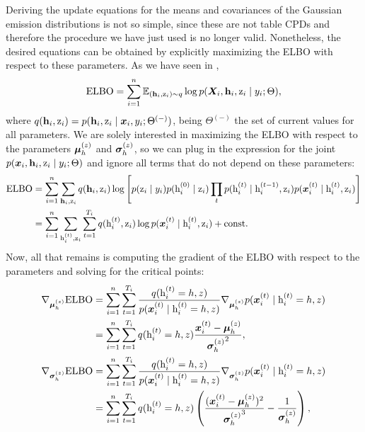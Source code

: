 Deriving the update equations for the means and covariances of the Gaussian emission distributions is not so simple, since these are not table CPDs and therefore the procedure we have just used is no longer valid. Nonetheless, the desired equations can be obtained by explicitly maximizing the ELBO with respect to these parameters. As we have seen in ,
\begin{equation}
	\label{eq:mhmm_elbo}
	\mathrm{ELBO} = \sum_{i=1}^{n} \mathbb{E}_{({\mathbf{h}}_i,{\textnormal{z}}_i) \sim q} \log p({\bm{X}}_i, {\mathbf{h}}_i, {\textnormal{z}}_i \mid y_i; \Theta),
\end{equation}
where $q({\mathbf{h}}_i,{\textnormal{z}}_i) = p({\mathbf{h}}_i, {\textnormal{z}}_i \mid {\bm{x}}_i, y_i; \Theta^{(-)})$, being $\Theta^{(-)}$ the set of current values for all parameters. We are solely interested in maximizing the ELBO with respect to the parameters ${\bm{\mu}}^{(z)}_h$ and ${\bm{\sigma}}^{(z)}_h$, so we can plug in the expression for the joint $p({\bm{x}}_i, {\mathbf{h}}_i, {\textnormal{z}}_i \mid y_i; \Theta)$ and ignore all terms that do not depend on these parameters:
\begin{align}
	\label{eq:mhmm_elbo_gaussian_params}
	\mathrm{ELBO} &= \sum_{i=1}^n \sum_{{\mathbf{h}}_i, {\textnormal{z}}_i} q({\mathbf{h}}_i,{\textnormal{z}}_i) \log \left[p({\textnormal{z}}_i \mid y_i) p({\textnormal{h}}^{(0)}_i \mid {\textnormal{z}}_i) \prod_t p({\textnormal{h}}^{(t)}_i \mid {\textnormal{h}}^{(t-1)}_i, {\textnormal{z}}_i) p({\bm{x}}^{(t)}_i \mid {\textnormal{h}}^{(t)}_i, {\textnormal{z}}_i) \right] \nonumber\\
	&= \sum_{i=1}^n \sum_{{\textnormal{h}}^{(t)}_i, {\textnormal{z}}_i} \sum_{t=1}^{T_i} q({\textnormal{h}}^{(t)}_i, {\textnormal{z}}_i) \log p({\bm{x}}^{(t)}_i \mid {\textnormal{h}}^{(t)}_i, {\textnormal{z}}_i) + \text{const}.
\end{align}
Now, all that remains is computing the gradient of the ELBO with respect to the parameters and solving for the critical points:
\begin{align}
&\nabla_{\vmu^{(z)}_h} \mathrm{ELBO} = \sum_{i=1}^n \sum_{t=1}^{T_i} \frac{q(\rh^{(t)}_i=h, z)}{p(\vx^{(t)}_i \mid \rh^{(t)}_i=h, z)} \nabla_{\vmu^{(z)}_h} p(\vx^{(t)}_i \mid \rh^{(t)}_i=h, z) \nonumber\\
&\hphantom{\nabla_{\vmu^{(z)}_h} \mathrm{ELBO}} = \sum_{i=1}^n  \sum_{t=1}^{T_i} q(\rh^{(t)}_i=h, z) \frac{\vx^{(t)}_i - \vmu^{(z)}_h}{{\vsigma^{(z)}_h}^2}, \\
&\nabla_{\vsigma^{(z)}_h} \mathrm{ELBO} = \sum_{i=1}^n \sum_{t=1}^{T_i} \frac{q(\rh^{(t)}_i=h, z)}{p(\vx^{(t)}_i \mid \rh^{(t)}_i=h, z)} \nabla_{\vsigma^{(z)}_h} p(\vx^{(t)}_i \mid \rh^{(t)}_i=h, z) \nonumber\\
&\hphantom{\nabla_{\vsigma^{(z)}_h} \mathrm{ELBO}} = \sum_{i=1}^n  \sum_{t=1}^{T_i} q(\rh^{(t)}_i=h, z) \left(\frac{(\vx^{(t)}_i - \vmu^{(z)}_h)^2}{{\vsigma^{(z)}_h}^3} - \frac{1}{\vsigma^{(z)}_h}\right),
\end{align}

